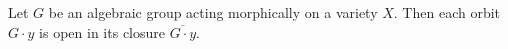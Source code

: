 Let $G$ be an algebraic group acting morphically on a variety $X$. Then each orbit $G \cdot y$ is open in its closure $\overline{G \cdot y}$.
